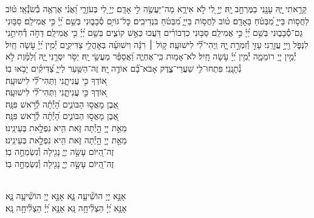 \documentclass[twoside, openany, parskip=half, 11pt]{book}
\begin{document}
{
קָרָ֣אתִי יׇּ֑הּ עָנָ֖נִי בַמֶּרְחָ֣ב יׇֽהּ׃
יְיָ֣ לִ֭י לֹ֣א אִירָ֑א מַה־יַּעֲשֶׂ֖ה לִ֣י אָדָֽם׃
יְיָ֣ לִ֭י בְּעֹזְרָ֑י וַ֝אֲנִ֗י אֶרְאֶ֥ה בְ֯שֹׂנְ֯אָֽי׃
ט֗וֹב לַחֲס֥וֹת בַּייָ֑ מִ֝בְּטֹ֗חַ בָּאָדָֽם׃
ט֗וֹב לַחֲס֥וֹת בַּייָ֑ מִ֝בְּטֹ֗חַ בִּנְדִיבִֽים׃
כׇּל־גּוֹיִ֥ם סְ֯בָב֑וּנִי בְּשֵׁ֥ם יְ֝יָ֗ כִּ֣י אֲמִילַֽם׃
סַבּ֥וּנִי גַם־סְ֯בָב֑וּנִי בְּשֵׁ֥ם יְ֝יָ֗ כִּ֣י אֲמִילַֽם׃
סַבּ֤וּנִי כִדְבוֹרִ֗ים דֹּ֭עֲכוּ כְּאֵ֣שׁ קוֹצִ֑ים בְּשֵׁ֥ם יְ֝יָ֗ כִּ֣י אֲמִילַֽם׃
דַּחֹ֣ה דְ֯חִיתַ֣נִי לִנְפֹּ֑ל וַ֖ייָ֣ עֲזָרָֽנִי׃
עָזִּ֣י וְ֯זִמְרָ֣ת יׇ֑הּ וַֽיְהִי־לִ֗֝י לִישׁוּעָֽה׃
ק֤וֹל ׀ רִנָּ֬ה וִישׁוּעָ֗ה בְּאׇהֳלֵ֥י צַדִּיקִ֑ים יְ֯מִ֥ין יְ֝יָ֗ עֹ֣שָׂה חָֽיִל׃
יְ֯מִ֣ין יְיָ֭ רוֹמֵמָ֑ה יְ֯מִ֥ין יְ֝יָ֗ עֹ֣שָׂה חָֽיִל׃
לֹא־אָמ֥וּת כִּֽי־אֶחְיֶ֑ה וַ֝אֲסַפֵּ֗ר מַעֲשֵׂ֥י יׇֽהּ׃
יַסֹּ֣ר יִסְּרַ֣נִּי יׇּ֑הּ וְ֝לַמָּ֗וֶת לֹ֣א נְ֯תָנָֽנִי׃
פִּתְחוּ־לִ֥י שַׁעֲרֵי־צֶ֑דֶק אָבֹא־בָ֗֝ם אוֹדֶ֥ה יׇֽהּ׃
זֶה־הַשַּׁ֥עַר לַייָ֑ צַ֝דִּיקִ֗ים יָבֹ֥אוּ בֽוֹ׃\\
א֭וֹדְךָ כִּ֣י עֲנִיתָ֑נִי וַתְּהִי־לִ֗֝י לִישׁוּעָֽה׃ \\
\scriptsize{ א֭וֹדְךָ כִּ֣י עֲנִיתָ֑נִי \hfill וַתְּהִי־לִ֗֝י לִישׁוּעָֽה׃ \\}\normalsize{}
אֶ֭בֶן מָאֲס֣וּ הַבּוֹנִ֑ים \hfill הָ֝יְ֯תָ֗ה לְ֯רֹ֣אשׁ פִּנָּֽה׃ \\
\scriptsize{ אֶ֭בֶן מָאֲס֣וּ הַבּוֹנִ֑ים \hfill הָ֝יְ֯תָ֗ה לְ֯רֹ֣אשׁ פִּנָּֽה׃ \\}\normalsize{}
מֵאֵ֣ת יְיָ֭ הָ֣יְ֯תָה זֹּ֑את \hfill הִ֖יא נִפְלָ֣את בְּעֵינֵֽינוּ׃ \\
\scriptsize{ מֵאֵ֣ת יְיָ֭ הָ֣יְ֯תָה זֹּ֑את \hfill הִ֖יא נִפְלָ֣את בְּעֵינֵֽינוּ׃ \\}\normalsize{}
זֶה־הַ֭יּוֹם עָשָׂ֣ה יְיָ֑ \hfill נָגִ֖ילָה וְ֯נִשְׂמְחָ֣ה בֽוֹ׃ \\
\scriptsize{ זֶה־הַ֭יּוֹם עָשָׂ֣ה יְיָ֑ \hfill נָגִ֖ילָה וְ֯נִשְׂמְחָ֣ה בֽוֹ׃ } \normalsize{}


\\
אָנָּ֣א יְיָ֭ הוֹשִׁ֘יעָ֥ה נָּ֑א \hfill \scriptsize{אָנָּ֣א יְיָ֭ הוֹשִׁ֘יעָ֥ה נָּ֑א}\\ \normalsize
אָנָּ֥א יְ֝יָ֗ הַצְלִ֘יחָ֥ה נָּֽא \hfill \scriptsize{ אָנָּ֥א יְ֝יָ֗ הַצְלִ֘יחָ֥ה נָּֽא׃}\\ \normalsize


}
\end{document}

